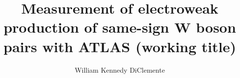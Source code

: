 
\title{Measurement of electroweak production of same-sign W boson pairs with ATLAS (working title)} 

\author{William Kennedy DiClemente}

\newcommand{\adviser}{I. Joseph Kroll, Professor, Physics}
\newcommand{\advisershort}{J. Kroll}

\newcommand{\myinstitution}{The University of Pennsylvania}

\newcommand{\chairperson}{Joshua Klein, Professor, Physics}

\newcommand{\committeeOne}{(Committee Prof. 1), Professor, Physics}
\newcommand{\committeeTwo}{(Committee Prof. 2), Associate Professor, Physics}
\newcommand{\committeeThree}{(Committee Prof. 3), Professor, Physics}
\newcommand{\committeeFour}{(Committee Prof. 4), Professor, Physics}






